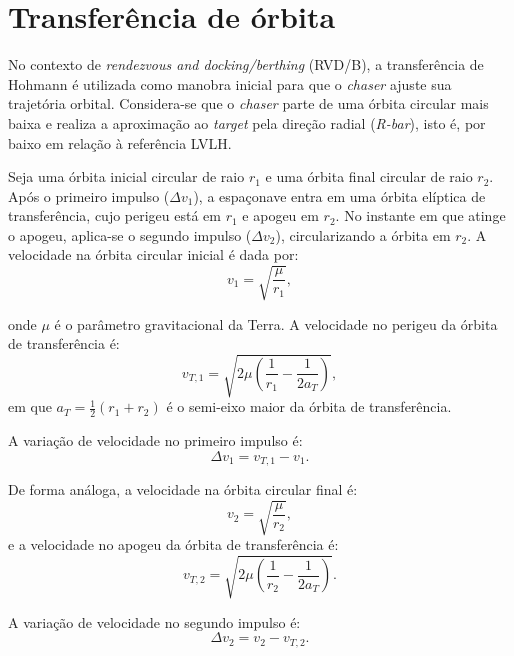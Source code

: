 \section{Transferência de órbita}
\label{sec:hohmann}

No contexto de \emph{rendezvous and docking/berthing} (RVD/B), a transferência de Hohmann é utilizada como manobra inicial para que o \emph{chaser} ajuste sua trajetória orbital. 
Considera-se que o \emph{chaser} parte de uma órbita circular mais baixa e realiza a aproximação ao \emph{target} pela direção radial (\emph{R-bar}), isto é, por baixo em relação à referência LVLH.

Seja uma órbita inicial circular de raio $r_1$ e uma órbita final circular de raio $r_2$. 
Após o primeiro impulso ($\Delta v_1$), a espaçonave entra em uma órbita elíptica de transferência, cujo perigeu está em $r_1$ e apogeu em $r_2$. 
No instante em que atinge o apogeu, aplica-se o segundo impulso ($\Delta v_2$), circularizando a órbita em $r_2$. A velocidade na órbita circular inicial é dada por:
\begin{equation}
    v_1 = \sqrt{\frac{\mu}{r_1}},
\end{equation}

onde $\mu$ é o parâmetro gravitacional da Terra. 
A velocidade no perigeu da órbita de transferência é:
\begin{equation}
    v_{T,1} = \sqrt{2\mu \left(\frac{1}{r_1} - \frac{1}{2a_T}\right)},
\end{equation}
em que $a_T = \tfrac{1}{2}(r_1+r_2)$ é o semi-eixo maior da órbita de transferência.

A variação de velocidade no primeiro impulso é:
\begin{equation}
    \Delta v_1 = v_{T,1} - v_1.
\end{equation}

De forma análoga, a velocidade na órbita circular final é:
\begin{equation}
    v_2 = \sqrt{\frac{\mu}{r_2}},
\end{equation}
e a velocidade no apogeu da órbita de transferência é:
\begin{equation}
    v_{T,2} = \sqrt{2\mu \left(\frac{1}{r_2} - \frac{1}{2a_T}\right)}.
\end{equation}

A variação de velocidade no segundo impulso é:
\begin{equation}
    \Delta v_2 = v_2 - v_{T,2}.
\end{equation}

